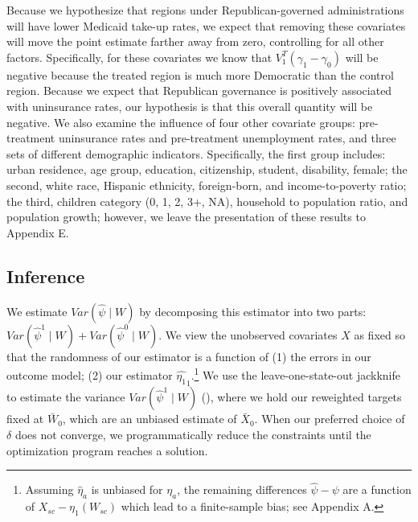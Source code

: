 \documentclass[aoas]{imsart}
\theoremstyle{plain}
\theoremstyle{remark}
\begin{document}
Because we hypothesize that regions under Republican-governed administrations will have lower Medicaid take-up rates, we expect that removing these covariates will move the point estimate farther away from zero, controlling for all other factors. Specifically, for these covariates we know that $V_1^T(\gamma_1 - \gamma_0)$ will be negative because the treated region is much more Democratic than the control region. Because we expect that Republican governance is positively associated with uninsurance rates, our hypothesis is that this overall quantity will be negative. We also examine the influence of four other covariate groups: pre-treatment uninsurance rates and pre-treatment unemployment rates, and three sets of different demographic indicators. Specifically, the first group includes: urban residence, age group, education, citizenship, student, disability, female; the second, white race, Hispanic ethnicity, foreign-born, and income-to-poverty ratio; the third, children category (0, 1, 2, 3+, NA), household to population ratio, and population growth; however, we leave the presentation of these results to Appendix E.

\subsection{Inference}

We estimate $Var(\hat{\psi} \mid W)$ by decomposing this estimator into two parts: $Var(\hat{\psi}^1 \mid W) + Var(\hat{\psi}^0 \mid W)$. We view the unobserved covariates $X$ as fixed so that the randomness of our estimator is a function of (1) the errors in our outcome model; (2) our estimator $\hat{\eta_1}_1$.\footnote{Assuming $\hat{\eta}_a$ is unbiased for $\eta_a$, the remaining differences $\hat{\psi} - \psi$ are a function of $X_{sc} - \eta_1(W_{sc})$ which lead to a finite-sample bias; see Appendix A.} We use the leave-one-state-out jackknife to estimate the variance $Var(\hat{\psi}^1 \mid W)$ (\cite{cameron2015practitioner}), where we hold our reweighted targets fixed at $\bar{W}_0$, which are an unbiased estimate of $\bar{X}_0$. When our preferred choice of $\delta$ does not converge, we programmatically reduce the constraints until the optimization program reaches a solution. 
\end{document}
